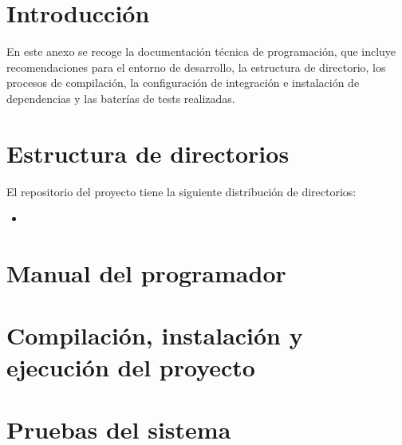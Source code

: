 
\section{Introducción}

En este anexo se recoge la documentación técnica de programación, que incluye recomendaciones para el entorno de desarrollo, la estructura de directorio, los procesos de compilación, la configuración de integración e instalación de dependencias y las baterías de tests realizadas. 

\section{Estructura de directorios}

El repositorio del proyecto tiene la siguiente distribución de directorios:

\begin{itemize}
\tightlist
\item

\end{itemize}
\section{Manual del programador}

\section{Compilación, instalación y ejecución del proyecto}

\section{Pruebas del sistema}
